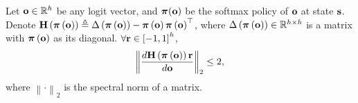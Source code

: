 \begin{lem}
\label{lem:Hr_spectral_norm_upper_bound}
    Let ${\mathbf{o}} \in {\mathbb{R}}^h$ be any logit vector, and ${\boldsymbol{\pi}}({\mathbf{o}})$ be the softmax policy of ${\mathbf{o}}$ at state ${\mathbf{s}}$. Denote ${\mathbf{H}}\left( {\boldsymbol{\pi}} \left({\mathbf{o}} \right) \right) \triangleq \Delta \left( {\boldsymbol{\pi}} \left({\mathbf{o}} \right) \right) - {\boldsymbol{\pi}} \left({\mathbf{o}} \right) {\boldsymbol{\pi}} \left({\mathbf{o}} \right)^\top$, where $\Delta \left( {\boldsymbol{\pi}} \left({\mathbf{o}} \right) \right) \in {\mathbb{R}}^{h \times h}$ is a matrix with ${\boldsymbol{\pi}} \left({\mathbf{o}} \right)$ as its diagonal. $\forall {\mathbf{r}} \in \left[ -1, 1\right]^h$,
\begin{equation*}
    \left\| \frac{d {\mathbf{H}}\left( {\boldsymbol{\pi}} \left({\mathbf{o}} \right) \right) {\mathbf{r}}}{d {\mathbf{o}} } \right\|_2 \le 2,
\end{equation*}
where $\left\| \cdot \right\|_2$ is the spectral norm of a matrix.
\end{lem}
